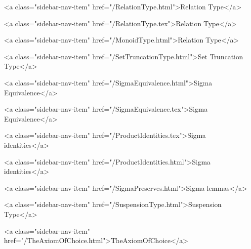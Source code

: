       
    
      
        
          <a class="sidebar-nav-item" href="/RelationType.html">Relation Type</a>
        
      
    
      
        
          <a class="sidebar-nav-item" href="/RelationType.tex">Relation Type</a>
        
      
    
      
        
          <a class="sidebar-nav-item" href="/MonoidType.html">Relation Type</a>
        
      
    
      
        
          <a class="sidebar-nav-item" href="/SetTruncationType.html">Set Truncation Type</a>
        
      
    
      
        
          <a class="sidebar-nav-item" href="/SigmaEquivalence.html">Sigma Equivalence</a>
        
      
    
      
        
          <a class="sidebar-nav-item" href="/SigmaEquivalence.tex">Sigma Equivalence</a>
        
      
    
      
        
          <a class="sidebar-nav-item" href="/ProductIdentities.tex">Sigma identities</a>
        
      
    
      
        
          <a class="sidebar-nav-item" href="/ProductIdentities.html">Sigma identities</a>
        
      
    
      
        
          <a class="sidebar-nav-item" href="/SigmaPreserves.html">Sigma lemmas</a>
        
      
    
      
        
          <a class="sidebar-nav-item" href="/SuspensionType.html">Suspension Type</a>
        
      
    
      
        
          <a class="sidebar-nav-item" href="/TheAxiomOfChoice.html">TheAxiomOfChoice</a>
        

